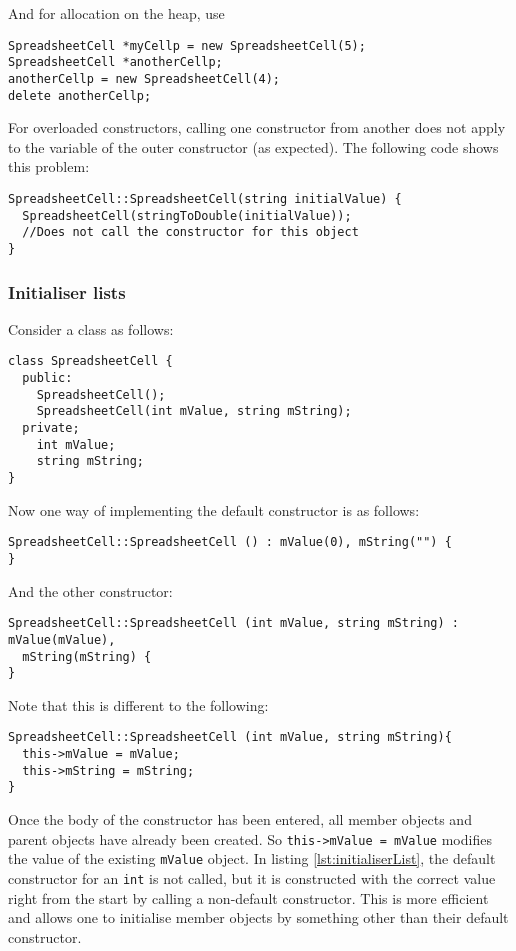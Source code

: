 \documentclass[a4paper,12pt]{article}
\begin{document}
And for allocation on the heap, use
\begin{lstlisting}
SpreadsheetCell *myCellp = new SpreadsheetCell(5);
SpreadsheetCell *anotherCellp;
anotherCellp = new SpreadsheetCell(4);
delete anotherCellp;
\end{lstlisting}

For overloaded constructors, calling one constructor from another does not apply to the variable of the outer constructor (as expected). The following code shows this problem:

\begin{lstlisting}
SpreadsheetCell::SpreadsheetCell(string initialValue) {
  SpreadsheetCell(stringToDouble(initialValue));
  //Does not call the constructor for this object
}
\end{lstlisting}

\subsubsection{Initialiser lists}
Consider a class as follows:
\begin{lstlisting}
class SpreadsheetCell {
  public:
    SpreadsheetCell();
    SpreadsheetCell(int mValue, string mString);
  private;
    int mValue;
    string mString;
}
\end{lstlisting}

Now one way of implementing the default constructor is as follows:
\begin{lstlisting}
SpreadsheetCell::SpreadsheetCell () : mValue(0), mString("") {
}
\end{lstlisting}

And the other constructor:

\begin{lstlisting}[caption={C++ gets it right with the name clash}, label={lst:initialiserList}]
SpreadsheetCell::SpreadsheetCell (int mValue, string mString) : mValue(mValue),
  mString(mString) {
}
\end{lstlisting}

Note that this is different to the following:

\begin{lstlisting}
SpreadsheetCell::SpreadsheetCell (int mValue, string mString){
  this->mValue = mValue;
  this->mString = mString;
}
\end{lstlisting}

Once the body of the constructor has been entered, all member objects and parent objects have already been created. So \lstinline|this->mValue = mValue| modifies the value of the existing \lstinline|mValue| object. In listing \ref{lst:initialiserList}, the default constructor for an \lstinline|int| is not called, but it is constructed with the correct value right from the start by calling a non-default constructor. This is more efficient and allows one to initialise member objects by something other than their default constructor.
\end{document}

